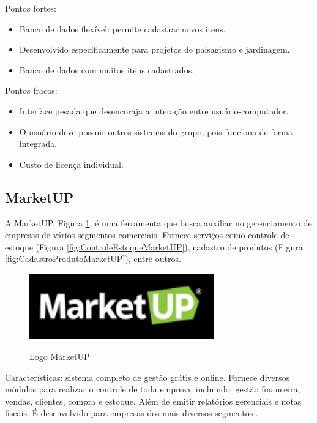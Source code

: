 Pontos fortes:
\begin{itemize}
\item Banco de dados flexível: permite cadastrar novos itens.
 \item Desenvolvido especificamente para projetos de paisagismo e jardinagem.
 \item Banco de dados com muitos itens cadastrados.
 \end{itemize}
 
Pontos fracos:
\begin{itemize}
    \item Interface pesada que desencoraja a interação entre usuário-computador.
    \item O usuário deve possuir outros sistemas do grupo, pois funciona de forma integrada.
    \item Custo de licença individual.
 \end{itemize}
 


\subsection{MarketUP}

A MarketUP, Figura \ref{fig:logoMarketUP}, é uma ferramenta que busca auxiliar no gerenciamento de empresas de vários segmentos comerciais. Fornece serviços como controle de estoque (Figura \ref{fig:ControleEstoqueMarketUP}), cadastro de produtos (Figura \ref{fig:CadastroProdutoMarketUP}), entre outros. 

\begin{figure}[htp]
\centering
\caption{Logo MarketUP}
\includegraphics[width=8cm]{imagens/mark.png}
\label{fig:logoMarketUP}
\end{figure}


Características: sistema completo de gestão grátis e online. Fornece diversos módulos para realizar o controle de toda empresa, incluindo: gestão financeira, vendas, clientes, compra e estoque. Além de emitir relatórios gerenciais e notas fiscais. É desenvolvido para empresas dos mais diversos segmentos \cite{marketup}.

